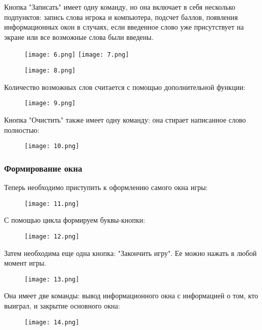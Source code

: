 \documentclass[10pt,pdf,hyperref={unicode}]{beamer}
\newcommand{\jj}{\righthyphenmin=20 \justifying}
\begin{document}
	\begin{frame}
		\jj
		Кнопка "Записать" имеет одну команду, но она включает в себя несколько подпунктов: запись слова игрока и компьютера, подсчет баллов, появления информационных окон в случаях, если введенное слово уже присутствует на экране или все возможные слова были введены. 
		 \begin{figure}[h]
		 \texttt{[image: 6.png]}
		 \texttt{[image: 7.png]}
		 \end{figure}
	\end{frame}
	
	\begin{frame}
		\begin{figure}[h]
		\texttt{[image: 8.png]}
		\end{figure}
		\jj
		Количество возможных слов считается с помощью дополнительной функции:
		\begin{figure}[h]
			\texttt{[image: 9.png]}
		\end{figure}
	\end{frame}
	
	\begin{frame}
		\jj
		Кнопка "Очистить" также имеет одну команду: она стирает написанное слово полностью:
		\begin{figure}[h]
			\texttt{[image: 10.png]}
		\end{figure}
	\end{frame}
	
	\begin{frame}
		\frametitle{Формирование окна}
		\jj
		Теперь необходимо приступить к оформлению самого окна игры:
		\begin{figure}[h]
			\texttt{[image: 11.png]}
		\end{figure}
	\end{frame}

	\begin{frame}
		\jj
		С помощью цикла формируем буквы-кнопки:
		\begin{figure}[h]
			\texttt{[image: 12.png]}
		\end{figure}
		\jj
		Затем необходима еще одна кнопка: "Закончить игру". Ее можно нажать в любой момент игры.
		\begin{figure}[h]
			\texttt{[image: 13.png]}
		\end{figure}
		\jj
		Она имеет две команды: вывод информационного окна с информацией о том, кто выиграл, и закрытие основного окна:
		\begin{figure}[h]
			\texttt{[image: 14.png]}
		\end{figure}
	\end{frame}
\end{document}
